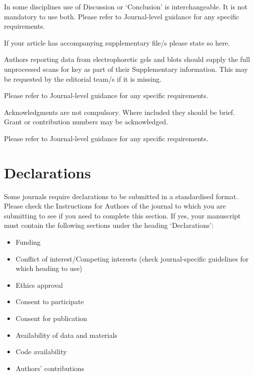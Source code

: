 \documentclass[sn-vancouver,Numbered,pdflatex]{sn-jnl}
\theoremstyle{remark}
\theoremstyle{definition}
\providecommand{\tightlist}{%
  \setlength{\itemsep}{0pt}\setlength{\parskip}{0pt}}
\begin{document}
In some disciplines use of Discussion or `Conclusion' is
interchangeable. It is not mandatory to use both. Please refer to
Journal-level guidance for any specific requirements.

\backmatter


If your article has accompanying supplementary file/s please state so
here.

Authors reporting data from electrophoretic gels and blots should supply
the full unprocessed scans for key as part of their Supplementary
information. This may be requested by the editorial team/s if it is
missing.

Please refer to Journal-level guidance for any specific requirements.


Acknowledgments are not compulsory. Where included they should be brief.
Grant or contribution numbers may be acknowledged.

Please refer to Journal-level guidance for any specific requirements.

\hypertarget{declarations}{%
\section*{Declarations}\label{declarations}}

Some journals require declarations to be submitted in a standardised
format. Please check the Instructions for Authors of the journal to
which you are submitting to see if you need to complete this section. If
yes, your manuscript must contain the following sections under the
heading `Declarations':

\begin{itemize}
\tightlist
\item
  Funding
\item
  Conflict of interest/Competing interests (check journal-specific
  guidelines for which heading to use)
\item
  Ethics approval
\item
  Consent to participate
\item
  Consent for publication
\item
  Availability of data and materials
\item
  Code availability
\item
  Authors' contributions
\end{itemize}
\end{document}
